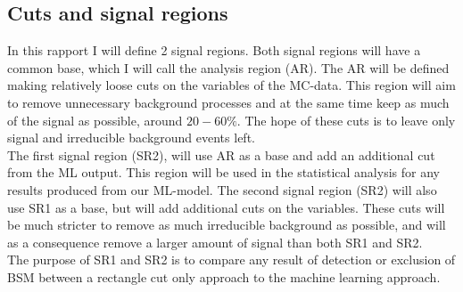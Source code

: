 \documentclass{article}
\begin{document}
\subsection{Cuts and signal regions}
In this rapport I will define 2 signal regions. Both signal regions will have a common base, which I will call the analysis region (AR). The AR will be defined making relatively loose cuts on the variables of the MC-data. This region will aim to remove unnecessary background processes and at the same time keep as much of the signal as possible, around $20-60\%$. The hope of these cuts is to leave only signal and irreducible background events left.
\\
The first signal region (SR2), will use AR as a base and add an additional cut from the ML output.  This region will be used in the statistical analysis for any results produced from our ML-model. The second signal region (SR2) will also use SR1 as a base, but will add additional cuts on the variables. These cuts will be much stricter to remove as much irreducible background as possible, and will as a consequence remove a larger amount of signal than both SR1 and SR2. 
\\
The purpose of SR1 and SR2 is to compare any result of detection or exclusion of BSM between a rectangle cut only approach to the machine learning approach. 
\end{document}

